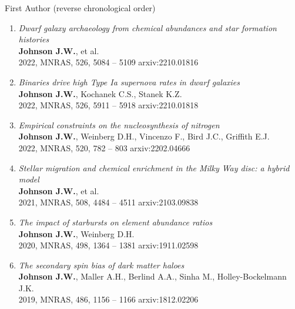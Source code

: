 \documentclass[cv.tex]{subfiles}
\begin{document}
%
\noindent
{\color{themecolor} \large First Author}
(reverse chronological order)
\par\noindent
\begin{enumerate}

	\vspace{-3mm}

	\item \textit{Dwarf galaxy archaeology from chemical abundances and star
	formation histories}
	\\
	\textbf{Johnson J.W.}, et al.
	\\
	2022, MNRAS, 526, 5084 -- 5109 \hfill arxiv:2210.01816

	\item \textit{Binaries drive high Type Ia supernova rates in dwarf
	galaxies}
	\\
	\textbf{Johnson J.W.}, Kochanek C.S., Stanek K.Z.
	\\
	2022, MNRAS, 526, 5911 -- 5918 \hfill arxiv:2210.01818

	\item \textit{Empirical constraints on the nucleosynthesis of nitrogen}
	\\
	\textbf{Johnson J.W.}, Weinberg D.H., Vincenzo F., Bird J.C., Griffith E.J.
	\\
	2022, MNRAS, 520, 782 -- 803 \hfill arxiv:2202.04666

	\item \textit{Stellar migration and chemical enrichment in the Milky Way
	disc: a hybrid model}
	\\
	\textbf{Johnson J.W.}, et al.
	\\
	2021, MNRAS, 508, 4484 -- 4511 \hfill arxiv:2103.09838

	\item \textit{The impact of starbursts on element abundance ratios}
	\\
	\textbf{Johnson J.W.}, Weinberg D.H.
	\\
	2020, MNRAS, 498, 1364 -- 1381 \hfill arxiv:1911.02598

	\item \textit{The secondary spin bias of dark matter haloes}
	\\
	\textbf{Johnson J.W.}, Maller A.H., Berlind A.A., Sinha M.,
	Holley-Bockelmann J.K.
	\\
	2019, MNRAS, 486, 1156 -- 1166 \hfill arxiv:1812.02206

\end{enumerate}
\end{document}
